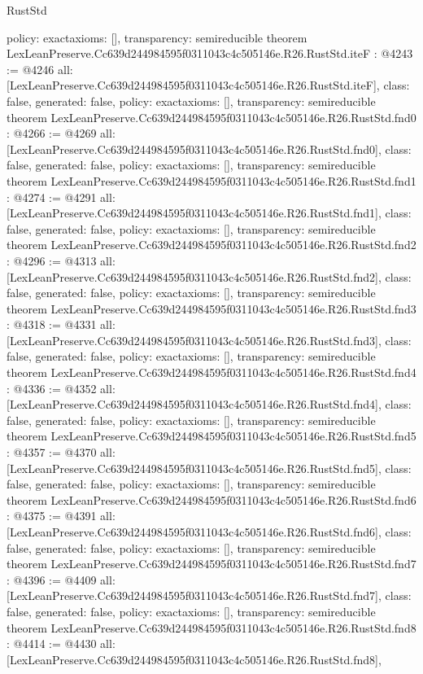 \begin{lexlean}{RustStd}
\begin{coremodule}
{  policy: exact{axioms: []},
  transparency: semireducible
}
theorem LexLeanPreserve.Cc639d244984595f0311043c4c505146e.R26.RustStd.iteF : @4243 := @4246 {
  all: [LexLeanPreserve.Cc639d244984595f0311043c4c505146e.R26.RustStd.iteF],
  class: false,
  generated: false,
  policy: exact{axioms: []},
  transparency: semireducible
}
theorem LexLeanPreserve.Cc639d244984595f0311043c4c505146e.R26.RustStd.fnd0 : @4266 := @4269 {
  all: [LexLeanPreserve.Cc639d244984595f0311043c4c505146e.R26.RustStd.fnd0],
  class: false,
  generated: false,
  policy: exact{axioms: []},
  transparency: semireducible
}
theorem LexLeanPreserve.Cc639d244984595f0311043c4c505146e.R26.RustStd.fnd1 : @4274 := @4291 {
  all: [LexLeanPreserve.Cc639d244984595f0311043c4c505146e.R26.RustStd.fnd1],
  class: false,
  generated: false,
  policy: exact{axioms: []},
  transparency: semireducible
}
theorem LexLeanPreserve.Cc639d244984595f0311043c4c505146e.R26.RustStd.fnd2 : @4296 := @4313 {
  all: [LexLeanPreserve.Cc639d244984595f0311043c4c505146e.R26.RustStd.fnd2],
  class: false,
  generated: false,
  policy: exact{axioms: []},
  transparency: semireducible
}
theorem LexLeanPreserve.Cc639d244984595f0311043c4c505146e.R26.RustStd.fnd3 : @4318 := @4331 {
  all: [LexLeanPreserve.Cc639d244984595f0311043c4c505146e.R26.RustStd.fnd3],
  class: false,
  generated: false,
  policy: exact{axioms: []},
  transparency: semireducible
}
theorem LexLeanPreserve.Cc639d244984595f0311043c4c505146e.R26.RustStd.fnd4 : @4336 := @4352 {
  all: [LexLeanPreserve.Cc639d244984595f0311043c4c505146e.R26.RustStd.fnd4],
  class: false,
  generated: false,
  policy: exact{axioms: []},
  transparency: semireducible
}
theorem LexLeanPreserve.Cc639d244984595f0311043c4c505146e.R26.RustStd.fnd5 : @4357 := @4370 {
  all: [LexLeanPreserve.Cc639d244984595f0311043c4c505146e.R26.RustStd.fnd5],
  class: false,
  generated: false,
  policy: exact{axioms: []},
  transparency: semireducible
}
theorem LexLeanPreserve.Cc639d244984595f0311043c4c505146e.R26.RustStd.fnd6 : @4375 := @4391 {
  all: [LexLeanPreserve.Cc639d244984595f0311043c4c505146e.R26.RustStd.fnd6],
  class: false,
  generated: false,
  policy: exact{axioms: []},
  transparency: semireducible
}
theorem LexLeanPreserve.Cc639d244984595f0311043c4c505146e.R26.RustStd.fnd7 : @4396 := @4409 {
  all: [LexLeanPreserve.Cc639d244984595f0311043c4c505146e.R26.RustStd.fnd7],
  class: false,
  generated: false,
  policy: exact{axioms: []},
  transparency: semireducible
}
theorem LexLeanPreserve.Cc639d244984595f0311043c4c505146e.R26.RustStd.fnd8 : @4414 := @4430 {
  all: [LexLeanPreserve.Cc639d244984595f0311043c4c505146e.R26.RustStd.fnd8],
}
\end{coremodule}
\end{lexlean}
